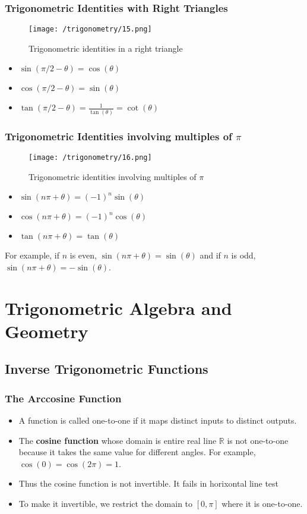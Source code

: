 \documentclass{beamer}
\begin{document}
\begin{frame}
    \frametitle{Trigonometric Identities with Right Triangles}
    \begin{figure}
        \centering
        \texttt{[image: /trigonometry/15.png]}
        \caption{Trigonometric identities in a right triangle}
    \end{figure}

    \begin{itemize}
        \item  \(\sin(\pi/2 - \theta) = \cos(\theta)\)
        \item \(\cos(\pi/2 - \theta) = \sin(\theta)\)
        \item \(\tan(\pi/2 - \theta) = \frac{1}{\tan(\theta)} = \cot(\theta)\)
    \end{itemize}
\end{frame}

\begin{frame}
    \frametitle{Trigonometric Identities involving multiples of \(\pi\)}
    \begin{figure}
        \centering
        \texttt{[image: /trigonometry/16.png]}
        \caption{Trigonometric identities involving multiples of \(\pi\)}
    \end{figure}
    \begin{itemize}
        \item \(\sin(n\pi + \theta) = (-1)^n \sin(\theta)\)
        \item \(\cos(n\pi + \theta) = (-1)^n \cos(\theta)\)
        \item \(\tan(n\pi + \theta) = \tan(\theta)\)
    \end{itemize}
    For example, if \(n\) is even, \(\sin(n\pi + \theta) = \sin(\theta)\) and if \(n\) is odd, \(\sin(n\pi + \theta) = -\sin(\theta)\). 
\end{frame}

\section{Trigonometric Algebra and Geometry}
\subsection{Inverse Trigonometric Functions}
\begin{frame}
    \frametitle{The Arccosine Function}
    \begin{itemize}
        \item A function is called one-to-one if it maps distinct inputs to distinct outputs.
        \item The \textbf{cosine function} whose domain is entire real line \(\mathbb{R}\) is not one-to-one because it takes the same value for different angles. For example, \(\cos(0) = \cos(2\pi) = 1\).
        \item Thus the cosine function is not invertible. It fails in horixontal line test
        \item To make it invertible, we restrict the domain to \([0, \pi]\) where it is one-to-one.
    \end{itemize}
\end{frame}
\end{document}
